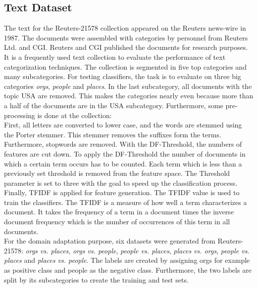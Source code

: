 \subsection{Text Dataset}\label{EmSubSecText}
The text for the Reuters-21578 collection appeared on the Reuters news-wire in 1987.
The documents were assembled with categories by personnel from Reuters Ltd. and \ac{CGI}.
Reuters and \acs{CGI} published the documents for research purposes.\cite{DavidD.Lewis.2004}\\
It is a frequently used text collection to evaluate the performance of text categorization techniques.
The collection is segmented in five top categories and many subcategories.
For testing classifiers, the task is to evaluate on three big categories \textit{orgs}, \textit{people} and \textit{places}. 
In the last subcategory, all documents with the topic USA are removed.
This makes the categories nearly even because more than a half of the documents are in the USA subcategory. 
Furthermore, some pre-processing is done at the collection:\cite{WenyuanDai.2007}\\
First, all letters are converted to lower case, and the words are stemmed using the Porter stemmer.
This stemmer removes the suffixes form the terms.\cite{Porter.1997} 
Furthermore, stopwords are removed. With the \ac{DF}-Threshold, the numbers of features are cut down.
To apply the \acs{DF}-Threshold the number of documents in which a certain term occurs has to be counted.
Each term which is less than a previously set threshold is removed from the feature space.\cite{Yang.1997}
The Threshold parameter is set to three with the goal to speed up the classification process.
Finally, \ac{TFIDF} is applied for feature generation.
The \acs{TFIDF} value is used to train the classifiers.
The \acs{TFIDF} is a measure of how well a term characterizes a document.
It takes the frequency of a term in a document times the inverse document frequency which is the number of occurrences of this term in all documents. \cite[p. 26]{Leskovec.2014}\\
For the domain adaptation purpose, six datasets were generated from Reuters-21578:
\textit{orgs vs. places}, \textit{orgs vs. people}, \textit{people vs. places}, \textit{places vs. orgs}, \textit{people vs. places} and \textit{places vs. people}.
The labels are created by assigning orgs for example as positive class and people as the negative class.
Furthermore, the two labels are split by its subcategories to create the training and test sets.\cite{WenyuanDai.2007}\\
